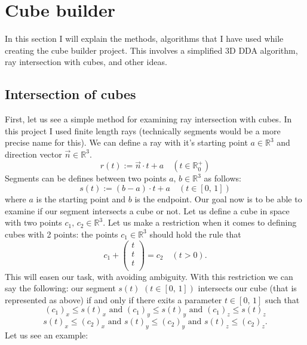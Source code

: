 \documentclass[12pt]{article}
\newcommand{\R}{\mathbb{R}}
\begin{document}
	\newpage	



		
	\section{Cube builder}
	In this section I will explain the methods, algorithms that I have used while creating the cube builder project. This involves a simplified 3D DDA algorithm, ray intersection with cubes, and other ideas.
	
	\subsection{Intersection of cubes}
	First, let us see a simple method for examining ray intersection with cubes. In this project I used finite length rays (technically segments would be a more precise name for this). We can define a ray with it's starting point $a \in \R^3$ and direction vector $\vec{n} \in \R^3$.
	\[
		r(t) := \vec{n} \cdot t + a \quad (t \in \R^+_0)
	\]
	Segments can be defines between two points $a, \, b \in \R^3$ as follows:
	\[
		s(t) := (b - a) \cdot t + a \quad (t \in [0, \, 1])
	\]
	where $a$ is the starting point and $b$ is the endpoint. Our goal now is to be able to examine if our segment intersects a cube or not. Let us define a cube in space with two points $c_1, \, c_2 \in \R^3$. Let us make a restriction when it comes to defining cubes with 2 points: the points $c_1 \in \R^3$ should hold the rule that
	\[
		c_1 + \begin{pmatrix}
			t \\
			t \\
			t \\
		\end{pmatrix}
		= c_2 \quad (t > 0).
	\]
	This will easen our task, with avoiding ambiguity. With this restriction we can say the following: our segment $s(t) \, \, (t \in [0, \, 1])$ intersects our cube (that is represented as above) if and only if there exits a parameter $t \in [0, \, 1]$ such that
	\[
		(c_1)_x \leq s(t)_x \text{ and } (c_1)_y \leq s(t)_y \text{ and } (c_1)_z \leq s(t)_z
	\]
	\[
		s(t)_x \leq (c_2)_x \text{ and } s(t)_y \leq (c_2)_y \text{ and } s(t)_z \leq (c_2)_z.
	\]
	Let us see an example:
\end{document}
